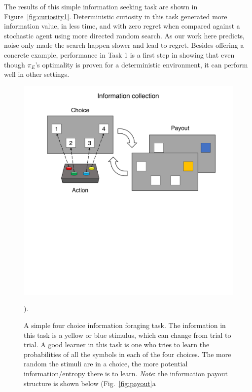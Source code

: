 The results of this simple information seeking task are shown in Figure~\ref{fig:curiosity1}. Deterministic curiosity in this task generated more information value, in less time, and with zero regret when compared against a stochastic agent using more directed random search. As our work here predicts, noise only made the search happen slower and lead to regret. Besides offering a concrete example, performance in Task 1 is a first step in showing that even though $\pi_E$'s optimality is proven for a deterministic environment, it can perform well in other settings.

\begin{figure}
	\begin{fullwidth}
	\includegraphics[width=.55\linewidth]{img/task_outline1.pdf} 
	\caption{A simple four choice information foraging task. The information in this task is a yellow or blue stimulus, which can change from trial to trial. A good learner in this task is one who tries to learn the probabilities of all the symbols in each of the four choices. The more random the stimuli are in a choice, the more potential information/entropy there is to learn. \textit{Note}: the information payout structure is shown below (Fig.~\ref{fig:payout}a}).
	\label{fig:task_outline1} 
	\end{fullwidth}
\end{figure}

